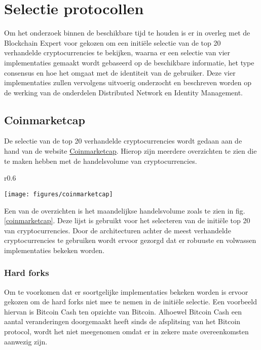 \section{Selectie protocollen}
\label{selectie}

Om het onderzoek binnen de beschikbare tijd te houden is er in overleg met de Blockchain Expert voor gekozen om een initiële selectie van de top 20 verhandelde cryptocurrencies te bekijken, waarna er een selectie van vier implementaties gemaakt wordt gebaseerd op de beschikbare informatie, het type consensus en hoe het omgaat met de identiteit van de gebruiker. Deze vier implementaties zullen vervolgens uitvoerig onderzocht en beschreven worden op de werking van de onderdelen Distributed Network en Identity Management. 

\subsection{Coinmarketcap}

De selectie van de top 20 verhandelde cryptocurrencies wordt gedaan aan de hand van de website \href{https://coinmarketcap.com/}{Coinmarketcap}. Hierop zijn meerdere overzichten te zien die te maken hebben met de handelsvolume van cryptocurrencies.
\begin{wrapfigure}[17]{r}{0.6\textwidth}
  \begin{center}
    \texttt{[image: figures/coinmarketcap]}
    \caption[Snapshot Coinmarketcap] {
      Meest verhandelde cryptocurrencies in de maand februari zoals gepresenteerd op de website van Coinmarketcap.
    }
    \label{coinmarketcap}
  \end{center}
\end{wrapfigure}
Een van de overzichten is het maandelijkse handelsvolume zoals te zien in fig. \ref{coinmarketcap}. Deze lijst is gebruikt voor het selecteren van de initiële top 20 van cryptocurrencies. Door de architecturen achter de meest verhandelde cryptocurrencies te gebruiken wordt ervoor gezorgd dat er robuuste en volwassen implementaties bekeken worden.

\subsubsection{Hard forks}
Om te voorkomen dat er soortgelijke implementaties bekeken worden is ervoor gekozen om de hard forks niet mee te nemen in de initiële selectie. Een voorbeeld hiervan is Bitcoin Cash ten opzichte van Bitcoin. Alhoewel Bitcoin Cash een aantal veranderingen doorgemaakt heeft sinds de afsplitsing van het Bitcoin protocol, wordt het niet meegenomen omdat er in zekere mate overeenkomsten aanwezig zijn.

